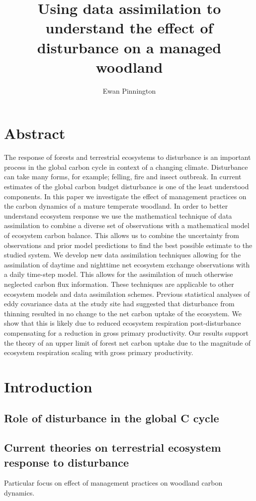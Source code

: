 \documentclass[11pt]{article}
\title{Using data assimilation to understand the effect of disturbance on a managed woodland}
\author{Ewan Pinnington}
\begin{document}
\maketitle


\section*{Abstract}
The response of forests and terrestrial ecosystems to disturbance is an important process in the global carbon cycle in context of a changing climate. Disturbance can take many forms, for example; felling, fire and insect outbreak. In current estimates of the global carbon budget disturbance is one of the least understood components. In this paper we investigate the effect of management practices on the carbon dynamics of a mature temperate woodland. In order to better understand ecosystem response we use the mathematical technique of data assimilation to combine a diverse set of observations with a mathematical model of ecosystem carbon balance. This allows us to combine the uncertainty from observations and prior model predictions to find the best possible estimate to the studied system. We develop new data assimilation techniques allowing for the assimilation of daytime and nighttime net ecosystem exchange observations with a daily time-step model. This allows for the assimilation of much otherwise neglected carbon flux information. These techniques are applicable to other ecosystem models and data assimilation schemes. Previous statistical analyses of eddy covariance data at the study site had suggested that disturbance from thinning resulted in no change to the net carbon uptake of the ecosystem. We show that this is likely due to reduced ecosystem respiration post-disturbance compensating for a reduction in gross primary productivity. Our results support the theory of an upper limit of forest net carbon uptake due to the magnitude of ecosystem respiration scaling with gross primary productivity.  

\section{Introduction}
\subsection{Role of disturbance in the global C cycle}

\subsection{Current theories on terrestrial ecosystem response to disturbance}
Particular focus on effect of management practices on woodland carbon dynamics.
\end{document}
